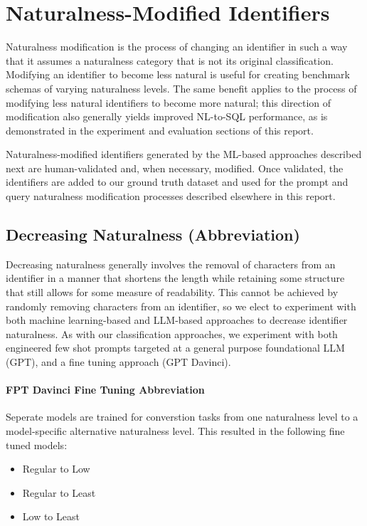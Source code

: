 \section{Naturalness-Modified Identifiers}


Naturalness modification is the process of changing an identifier in such a way that it assumes a naturalness category that is not its original classification.
Modifying an identifier to become less natural is useful for creating benchmark schemas of varying naturalness levels.
The same benefit applies to the process of modifying less natural identifiers to become more natural; this direction of modification also generally yields improved NL-to-SQL performance, as is demonstrated in the experiment and evaluation sections of this report.

Naturalness-modified identifiers generated by the ML-based approaches described next are human-validated and, when necessary, modified.
Once validated, the identifiers are added to our ground truth dataset and used for the prompt and query naturalness modification processes described elsewhere in this report.

\subsection{Decreasing Naturalness (Abbreviation)}
Decreasing naturalness generally involves the removal of characters from an identifier in a manner that shortens the length while retaining some structure that still allows for some measure of readability.
This cannot be achieved by randomly removing characters from an identifier, so we elect to experiment with both machine learning-based and LLM-based approaches to decrease identifier naturalness.
As with our classification approaches, we experiment with both engineered few shot prompts targeted at a general purpose foundational LLM (GPT), and a fine tuning approach (GPT Davinci).

\paragraph{\textbf{FPT Davinci Fine Tuning Abbreviation}}

Seperate models are trained for converstion tasks from one naturalness level to a model-specific alternative naturalness level.
This resulted in the following fine tuned models:

\begin{itemize}
  \item Regular to Low
  \item Regular to Least
  \item Low to Least
\end{itemize}

